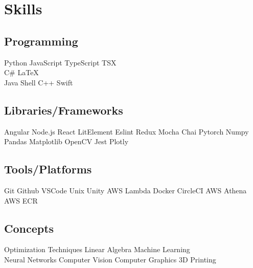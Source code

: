 \documentclass[]{plushcv}
\begin{document}
\hfill
\begin{minipage}[t]{0.25\textwidth}


    \section{Skills}
    \subsection{Programming}
    \sectionsep
    Python \textbullet{} JavaScript \textbullet{} TypeScript
    \textbullet{} TSX \textbullet{} \\
    \sectionsep
    C\# \textbullet{} \LaTeX\ \textbullet{} \\
    \sectionsep
    Java \textbullet{}  Shell \textbullet{} C++ \textbullet{} Swift \\
    \sectionsep
    \sectionsep
    \subsection{Libraries/Frameworks}
    \sectionsep
    Angular \textbullet{} Node.js \textbullet{}
    React \textbullet{} LitElement \textbullet{}
    Eslint \textbullet{} Redux \textbullet{}
    Mocha \textbullet{} Chai  \textbullet{} Pytorch 
    \textbullet{} Numpy \textbullet{} Pandas
    \textbullet{} Matplotlib \textbullet{} OpenCV
    \textbullet {} Jest \textbullet{} Plotly \textbullet{}
    \\
    \sectionsep
    \sectionsep
    \subsection{Tools/Platforms}
    \sectionsep
    Git \textbullet{} Github \textbullet{}
    VSCode \textbullet{}  Unix \textbullet{}
    Unity \textbullet{} AWS Lambda \textbullet{} Docker \textbullet{} CircleCI \textbullet{} AWS Athena \textbullet{} AWS ECR
    \\
    \sectionsep
    \sectionsep
    \subsection{Concepts}
    \sectionsep
    Optimization Techniques \textbullet{} Linear Algebra \textbullet{}
    Machine Learning \textbullet{} \\ Neural Networks \textbullet{}
    Computer Vision \textbullet{} Computer Graphics \textbullet{} 3D Printing
    \sectionsep


\end{minipage}
\end{document}
